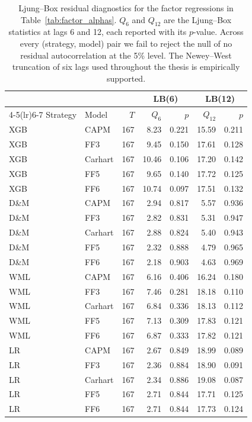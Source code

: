 \begin{table}[H]
\centering
\small
\begin{tabular}{l l r r r r r}
\toprule
 &  &  & \multicolumn{2}{c}{LB(6)} & \multicolumn{2}{c}{LB(12)} \\
\cmidrule(lr){4-5}\cmidrule(lr){6-7}
Strategy & Model & $T$ & $Q_6$ & $p$ & $Q_{12}$ & $p$ \\
\midrule
XGB & CAPM & 167 & 8.23 & 0.221 & 15.59 & 0.211 \\
XGB & FF3 & 167 & 9.45 & 0.150 & 17.61 & 0.128 \\
XGB & Carhart & 167 & 10.46 & 0.106 & 17.20 & 0.142 \\
XGB & FF5 & 167 & 9.65 & 0.140 & 17.72 & 0.125 \\
XGB & FF6 & 167 & 10.74 & 0.097 & 17.51 & 0.132 \\
D\&M & CAPM & 167 & 2.94 & 0.817 & 5.57 & 0.936 \\
D\&M & FF3 & 167 & 2.82 & 0.831 & 5.31 & 0.947 \\
D\&M & Carhart & 167 & 2.88 & 0.824 & 5.40 & 0.943 \\
D\&M & FF5 & 167 & 2.32 & 0.888 & 4.79 & 0.965 \\
D\&M & FF6 & 167 & 2.18 & 0.903 & 4.63 & 0.969 \\
WML & CAPM & 167 & 6.16 & 0.406 & 16.24 & 0.180 \\
WML & FF3 & 167 & 7.46 & 0.281 & 18.18 & 0.110 \\
WML & Carhart & 167 & 6.84 & 0.336 & 18.13 & 0.112 \\
WML & FF5 & 167 & 7.13 & 0.309 & 17.83 & 0.121 \\
WML & FF6 & 167 & 6.87 & 0.333 & 17.82 & 0.121 \\
LR & CAPM & 167 & 2.67 & 0.849 & 18.99 & 0.089 \\
LR & FF3 & 167 & 2.36 & 0.884 & 18.90 & 0.091 \\
LR & Carhart & 167 & 2.34 & 0.886 & 19.08 & 0.087 \\
LR & FF5 & 167 & 2.71 & 0.844 & 17.71 & 0.125 \\
LR & FF6 & 167 & 2.71 & 0.844 & 17.73 & 0.124 \\
\bottomrule
\end{tabular}
\caption{Ljung--Box residual diagnostics for the factor regressions in Table~\ref{tab:factor_alphas}. $Q_6$ and $Q_{12}$ are the Ljung--Box statistics at lags 6 and 12, each reported with its $p$-value. Across every (strategy, model) pair we fail to reject the null of no residual autocorrelation at the 5\% level. The Newey--West truncation of six lags used throughout the thesis is empirically supported.}
\label{tab:residual_diagnostics}
\end{table}
